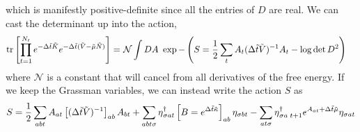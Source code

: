 which is manifestly positive-definite since all the entries of $D$ are real.
We can cast the determinant up into the action,
\begin{align}
	\text{tr}\left[ \prod_{t=1}^{N_t} e^{-\Delta \tilde{t}\tilde{K}}  e^{-\Delta \tilde{t} (\tilde{V} - \tilde{\mu}\tilde{N})}  \right]
	=&
	~\mathcal{N}
	\int DA ~ \exp -\left(S = \frac{1}{2} \sum_t A_t (\Delta\tilde{t}\tilde{V})^{-1} A_t - \log \det D^2 \right)
\end{align}
where $\mathcal{N}$ is a constant that will cancel from all derivatives of the free energy.
If we keep the Grassman variables, we can instead write the action $S$ as
\begin{align}
	S = 
	\frac{1}{2} \sum_{ab t} A_{at} \left[(\Delta\tilde{t} \tilde{V})^{-1}\right]_{ab} A_{bt}
+	\sum_{ab t \sigma} \eta{}^{\dagger}_{\sigma a t} \left[ B = e^{\Delta\tilde{t}\tilde{\kappa}}\right]_{ab} \eta_{\sigma b t}
-	\sum_{a t \sigma}\eta{}^{\dagger}_{\sigma a\; t+1} e^{A_{at} + \Delta \tilde{t} \tilde{\mu}} \eta_{\sigma a t}
\end{align}

